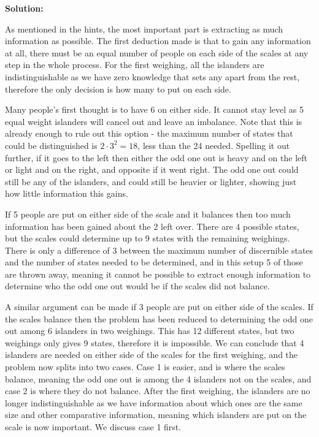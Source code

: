 \textbf{Solution:}

As mentioned in the hints, the most important part is extracting as much information as possible. The first deduction made is that to gain any information at all, there must be an equal number of people on each side of the scales at any step in the whole process. For the first weighing, all the islanders are indistinguishable as we have zero knowledge that sets any apart from the rest, therefore the only decision is how many to put on each side.

Many people's first thought is to have 6 on either side. It cannot stay level as 5 equal weight islanders will cancel out and leave an imbalance. Note that this is already enough to rule out this option - the maximum number of states that could be distinguished is $2 \cdot 3^2 = 18$, less than the 24 needed. Spelling it out further, if it goes to the left then either the odd one out is heavy and on the left or light and on the right, and opposite if it went right. The odd one out could still be any of the islanders, and could still be heavier or lighter, showing just how little information this gains.

If 5 people are put on either side of the scale and it balances then too much information has been gained about the 2 left over. There are 4 possible states, but the scales could determine up to 9 states with the remaining weighings. There is only a difference of 3 between the maximum number of discernible states and the number of states needed to be determined, and in this setup 5 of those are thrown away, meaning it cannot be possible to extract enough information to determine who the odd one out would be if the scales did not balance.

A similar argument can be made if 3 people are put on either side of the scales. If the scales balance then the problem has been reduced to determining the odd one out among 6 islanders in two weighings. This has 12 different states, but two weighings only gives 9 states, therefore it is impossible. We can conclude that 4 islanders are needed on either side of the scales for the first weighing, and the problem now splits into two cases. Case 1 is easier, and is where the scales balance, meaning the odd one out is among the 4 islanders not on the scales, and case 2 is where they do not balance. After the first weighing, the islanders are no longer indistinguishable as we have information about which ones are the same size and other comparative information, meaning which islanders are put on the scale is now important. We discuss case 1 first. 

